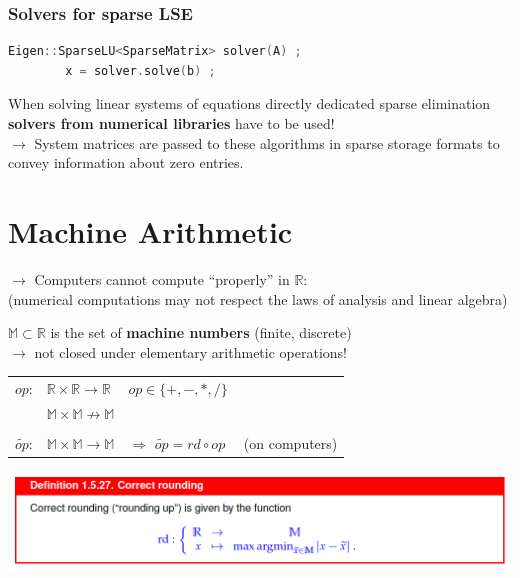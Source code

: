 \documentclass[12pt, a4paper]{article}
\newcommand{\R}{\mathbb{R}}
\newcommand{\M}{\mathbb{M}}
\begin{document}
\subsubsection{Solvers for sparse LSE}
	\begin{lstlisting}[language=C++, caption=LSE solvers (sparse)]
		Eigen::SparseLU<SparseMatrix> solver(A) ;
		x = solver.solve(b) ;
	\end{lstlisting}

\begin{tcolorbox}
	When solving linear systems of equations directly dedicated sparse elimination \textbf{solvers from numerical libraries} have to be used! \\
	
	$\rightarrow$ System matrices are passed to these algorithms in sparse storage formats to convey information about zero entries.	
\end{tcolorbox}





\newpage
\section{Machine Arithmetic}

$\rightarrow$ Computers cannot compute “properly” in $\R$: \\
(numerical computations may not respect the laws of analysis and linear algebra)\newline

$\M \subset \R$ is the set of \textbf{machine numbers} (finite, discrete) \\
$\rightarrow$ not closed under elementary arithmetic operations! \\

\begin{tabular}{lll}
	$op$: 	& 		$\R \times \R \rightarrow \R$ & 			$op \in \lbrace +, -, *, / \rbrace$	\\
			& 		$\M \times \M \not\rightarrow \M$  											\\
																								\\
	$\widetilde{op}$: &  		$\M \times \M \rightarrow \M$ 	& $\Rightarrow$ $\widetilde{op} = rd \circ op \quad $ (on computers) 
\end{tabular}

\begin{center}
	\includegraphics[width=1.0\textwidth]{rounding_function.png}
\end{center}
\end{document}
